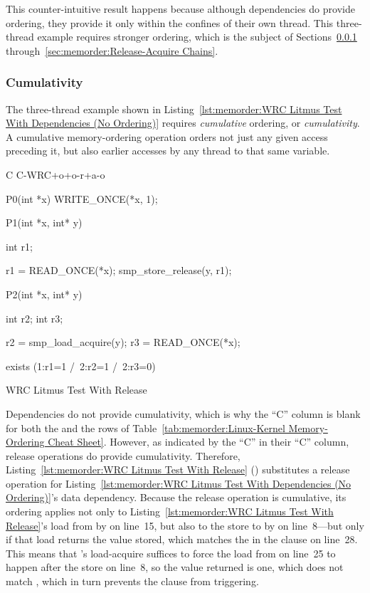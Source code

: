 This counter-intuitive result happens because although dependencies
do provide ordering, they provide it only within the confines of their
own thread.
This three-thread example requires stronger ordering, which
is the subject of
Sections~\ref{sec:memorder:Cumulativity}
through~\ref{sec:memorder:Release-Acquire Chains}.

\subsubsection{Cumulativity}
\label{sec:memorder:Cumulativity}

The three-thread example shown in
Listing~\ref{lst:memorder:WRC Litmus Test With Dependencies (No Ordering)}
requires \emph{cumulative} ordering, or \emph{cumulativity}.
A cumulative memory-ordering operation orders not just any given
access preceding it, but also earlier accesses by any thread to that
same variable.

\begin{listing}[tbp]
{ \scriptsize
\begin{verbbox}[\LstLineNo]
C C-WRC+o+o-r+a-o

{
}

P0(int *x)
{
  WRITE_ONCE(*x, 1);
}

P1(int *x, int* y)
{
  int r1;

  r1 = READ_ONCE(*x);
  smp_store_release(y, r1);
}

P2(int *x, int* y)
{
  int r2;
  int r3;

  r2 = smp_load_acquire(y);
  r3 = READ_ONCE(*x);
}

exists (1:r1=1 /\ 2:r2=1 /\ 2:r3=0)
\end{verbbox}
}
\centering
\theverbbox
\caption{WRC Litmus Test With Release}
\label{lst:memorder:WRC Litmus Test With Release}
\end{listing}

Dependencies do not provide cumulativity,
which is why the ``C'' column is blank for
both the  and the  rows
of Table~\ref{tab:memorder:Linux-Kernel Memory-Ordering Cheat Sheet}.
However, as indicated by the ``C'' in their ``C'' column,
release operations do provide cumulativity.
Therefore,
Listing~\ref{lst:memorder:WRC Litmus Test With Release}
()
substitutes a release operation for
Listing~\ref{lst:memorder:WRC Litmus Test With Dependencies (No Ordering)}'s
data dependency.
Because the release operation is cumulative, its ordering applies not only to
Listing~\ref{lst:memorder:WRC Litmus Test With Release}'s
load from  by  on line~15, but also to the store to 
by  on line~8---but only if that load returns the value stored,
which matches the  in the  clause on line~28.
This means that 's load-acquire suffices to force the
load from  on line~25 to happen after the store on line~8, so
the value returned is one, which does not match , which
in turn prevents the  clause from triggering.

